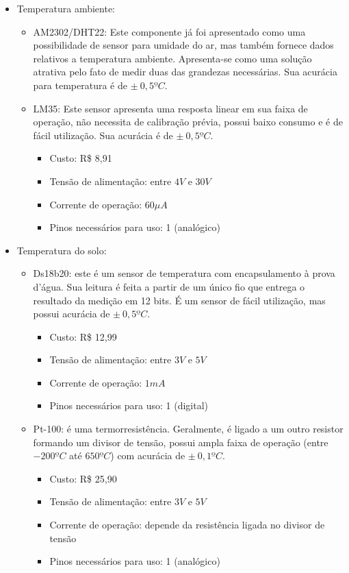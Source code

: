 \begin{itemize}


	\item Temperatura ambiente:
		\begin{itemize}
			\item AM2302/DHT22: Este componente já foi apresentado como uma possibilidade de sensor para umidade do ar, mas também fornece dados relativos a temperatura ambiente. Apresenta-se como uma solução atrativa pelo fato de medir duas das grandezas necessárias. Sua acurácia para temperatura é de $\pm~0,5ºC$.  
			 
			\item LM35: Este sensor apresenta uma resposta linear em sua faixa de operação, não necessita de calibração prévia, possui baixo consumo e é de fácil utilização. Sua acurácia é de $\pm~0,5ºC$.  
			\begin{itemize}
				\item Custo: R\$ 8,91 
				\item Tensão de alimentação: entre $4V$ e $30V$
				\item Corrente de operação: $60 \mu A$
				\item Pinos necessários para uso: 1 (analógico)
			\end{itemize}

		\end{itemize}
	\item Temperatura do solo:
		\begin{itemize}
			\item Ds18b20: este é um sensor de temperatura com encapsulamento à prova d'água. Sua leitura é feita a partir de um único fio que entrega o resultado da medição em 12 bits. É um sensor de fácil utilização, mas possui acurácia de $\pm~0,5ºC$.  
			\begin{itemize}
				\item Custo: R\$ 12,99 
				\item Tensão de alimentação: entre $3V$ e $5V$
				\item Corrente de operação: $1mA$
				\item Pinos necessários para uso: 1 (digital)
			\end{itemize}
			\item Pt-100: é uma termorresistência. Geralmente, é ligado a um outro resistor formando um divisor de tensão, possui ampla faixa de operação (entre $-200ºC$ até $650ºC$) com acurácia de $\pm~0,1ºC$.
			\begin{itemize}
				\item Custo: R\$ 25,90 
				\item Tensão de alimentação: entre $3V$ e $5V$
				\item Corrente de operação: depende da resistência ligada no divisor de tensão
				\item Pinos necessários para uso: 1 (analógico) 
			\end{itemize}


\end{itemize}
\end{itemize}
